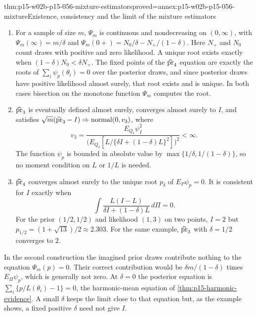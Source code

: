 \begin{hbtheorem}{thm:p15-w02b-p15-056-mixture-estimators}{proved=annex:p15-w02b-p15-056-mixture}{Existence, consistency and the limit of the mixture estimators}
\begin{enumerate}
\item For a sample of size \(m\), \(\Psi_m\) is continuous and
nondecreasing on \((0,\infty)\), with \(\Psi_m(\infty)=m/\delta\) and
\(\Psi_m(0+)=N_0/\delta-N_+/(1-\delta)\). Here \(N_+\) and \(N_0\) count
draws with positive and zero likelihood. A unique root exists exactly when
\((1-\delta)N_0<\delta N_+\). The fixed points of the
\(\widehat{\rm pr}_4\) equation are exactly the roots of
\(\sum_i\psi_p(\theta_i)=0\) over the posterior draws, and since
posterior draws have positive likelihood almost surely, that root exists
and is unique. In both cases bisection on the monotone function \(\Psi_m\)
computes the root.
\item \(\widehat{\rm pr}_3\) is eventually defined almost surely, converges
almost surely to \(I\), and satisfies
\(\sqrt m(\widehat{\rm pr}_3-I)\Rightarrow\operatorname{normal}(0,v_3)\),
where
\[
 v_3=\frac{E_{Q_\delta}\psi_I^2}
   {\bigl(E_{Q_\delta}[L/\{\delta I+(1-\delta)L\}^2]\bigr)^2}<\infty .
\]
The function \(\psi_p\) is bounded in absolute value by
\(\max\{1/\delta,1/(1-\delta)\}\), so no moment condition on \(L\) or
\(1/L\) is needed.
\item \(\widehat{\rm pr}_4\) converges almost surely to the unique root
\(p_\delta\) of \(E_P\psi_p=0\). It is consistent for \(I\) exactly when
\[
 \int\frac{L(I-L)}{\delta I+(1-\delta)L}\,d\Pi=0 .
\]
For the prior \((1/2,1/2)\) and likelihood \((1,3)\) on two points,
\(I=2\) but \(p_{1/2}=(1+\sqrt{13})/2\approx2.303\). For the same
example, \(\widehat{\rm pr}_3\) with \(\delta=1/2\) converges to \(2\).
\end{enumerate}
\end{hbtheorem}

In the second construction the imagined prior draws contribute nothing to
the equation \(\Psi_m(p)=0\). Their correct contribution would be
\(\delta m/(1-\delta)\) times \(E_\Pi\psi_p\), which is generally not
zero. At \(\delta=0\) the posterior equation is
\(\sum_i\{p/L(\theta_i)-1\}=0\), the harmonic-mean equation of
\cref{thm:p15-harmonic-evidence}. A small \(\delta\) keeps the limit
close to that equation but, as the example shows, a fixed positive
\(\delta\) need not give \(I\).

